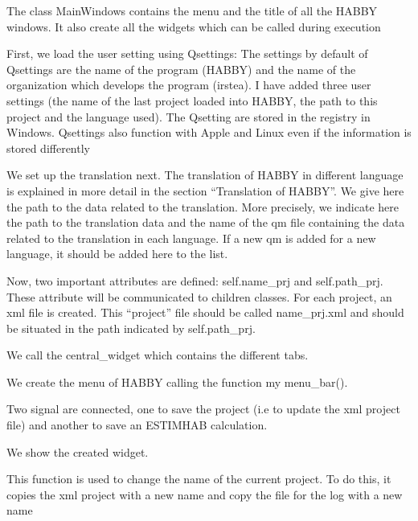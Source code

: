 \documentclass[letterpaper,10pt,english]{sphinxmanual}
\begin{document}
\begin{fulllineitems}
\label{\detokenize{index:src_GUI.Main_windows_1.MainWindows}}
The class MainWindows contains the menu and the title of all the HABBY windows.
It also create all the widgets which can be called during execution


First, we load the user setting using Qsettings: The settings by default of Qsettings are the name of the program (HABBY) and
the name of the organization which develops the program (irstea).  I have added three user settings (the name of the
last project loaded into HABBY, the path to this project and the language used). The Qsetting are stored in the
registry in Windows. Qsettings also function with Apple and Linux even if the information is stored differently

We set up the translation next. The translation of HABBY in different language is explained in more detail in
the section “Translation of HABBY”. We give here the path to the data related to the translation. More precisely, we indicate
here the path to the translation data and the name of the qm file containing the data related to the translation
in each language. If a new qm is added for a new language, it should be added here to the list.

Now, two important attributes are defined: self.name\_prj and self.path\_prj. These attribute will be communicated to
children classes. For each project, an xml file is created. This “project” file should be called name\_prj.xml
and should be situated in the path indicated by self.path\_prj.

We call the central\_widget which contains the different tabs.

We create the menu of HABBY calling the function my menu\_bar().

Two signal are connected, one to save the project (i.e to update the xml project file) and another to save an
ESTIMHAB calculation.

We show the created widget.

\begin{fulllineitems}
\label{\detokenize{index:src_GUI.Main_windows_1.MainWindows.change_name_project}}
This function is used to change the name of the current project. To do this, it copies the xml
project with a new name and copy the file for the log with a new name


\end{fulllineitems}
\end{fulllineitems}
\end{document}
